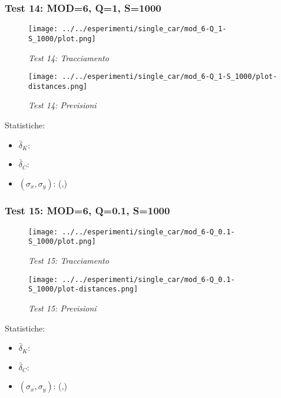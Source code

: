 \newpage
\subsubsection{Test 14: MOD=6, Q=1, S=1000}

\begin{figure}[hb]
\centering
\texttt{[image: ../../esperimenti/single\_car/mod\_6-Q\_1-S\_1000/plot.png]}
\caption{\textit{Test 14: Tracciamento}}
\end{figure}

\begin{figure}[hb]
\centering
\texttt{[image: ../../esperimenti/single\_car/mod\_6-Q\_1-S\_1000/plot-distances.png]}
\caption{\textit{Test 14: Previsioni}}
\end{figure}

Statistiche:
\begin{itemize}
\item \begin{math} \bar \delta_K:  \end{math}
\item \begin{math} \bar \delta_C:  \end{math}
\item \begin{math}(\sigma_x,\sigma_y)\end{math}: (,)
\end{itemize}


\newpage
\subsubsection{Test 15: MOD=6, Q=0.1, S=1000}

\begin{figure}[hb]
\centering
\texttt{[image: ../../esperimenti/single\_car/mod\_6-Q\_0.1-S\_1000/plot.png]}
\caption{\textit{Test 15: Tracciamento}}
\end{figure}

\begin{figure}[hb]
\centering
\texttt{[image: ../../esperimenti/single\_car/mod\_6-Q\_0.1-S\_1000/plot-distances.png]}
\caption{\textit{Test 15: Previsioni}}
\end{figure}

Statistiche:
\begin{itemize}
\item \begin{math} \bar \delta_K:  \end{math}
\item \begin{math} \bar \delta_C:  \end{math}
\item \begin{math}(\sigma_x,\sigma_y)\end{math}: (,)
\end{itemize}

